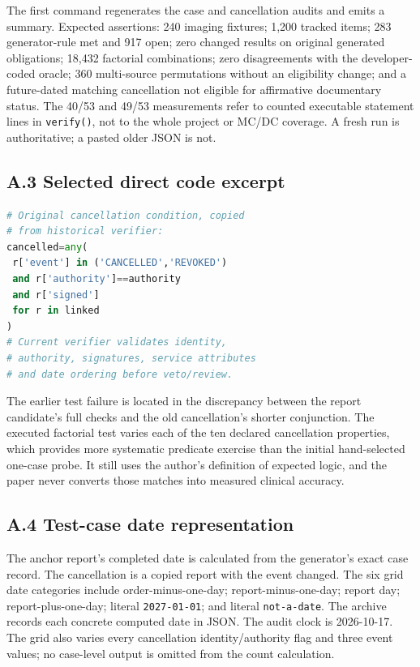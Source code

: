 \documentclass[11pt,twocolumn]{article}
\newcommand{\code}[1]{\texttt{#1}}
\begin{document}
The first command regenerates the case and cancellation audits and emits a summary. Expected assertions: 240 imaging fixtures; 1,200 tracked items; 283 generator-rule met and 917 open; zero changed results on original generated obligations; 18,432 factorial combinations; zero disagreements with the developer-coded oracle; 360 multi-source permutations without an eligibility change; and a future-dated matching cancellation not eligible for affirmative documentary status. The 40/53 and 49/53 measurements refer to counted executable statement lines in \code{verify()}, not to the whole project or MC/DC coverage. A fresh run is authoritative; a pasted older JSON is not.

\subsection*{A.3 Selected direct code excerpt}
\begin{lstlisting}[language=Python]
# Original cancellation condition, copied
# from historical verifier:
cancelled=any(
 r['event'] in ('CANCELLED','REVOKED')
 and r['authority']==authority
 and r['signed']
 for r in linked
)
# Current verifier validates identity,
# authority, signatures, service attributes
# and date ordering before veto/review.
\end{lstlisting}

The earlier test failure is located in the discrepancy between the report candidate's full checks and the old cancellation's shorter conjunction. The executed factorial test varies each of the ten declared cancellation properties, which provides more systematic predicate exercise than the initial hand-selected one-case probe. It still uses the author's definition of expected logic, and the paper never converts those matches into measured clinical accuracy.

\subsection*{A.4 Test-case date representation}
The anchor report's completed date is calculated from the generator's exact case record. The cancellation is a copied report with the event changed. The six grid date categories include order-minus-one-day; report-minus-one-day; report day; report-plus-one-day; literal \code{2027-01-01}; and literal \code{not-a-date}. The archive records each concrete computed date in JSON. The audit clock is 2026-10-17. The grid also varies every cancellation identity/authority flag and three event values; no case-level output is omitted from the count calculation.
\end{document}
